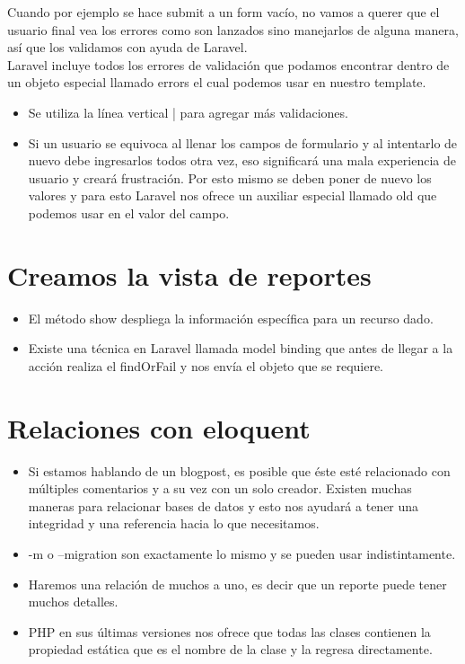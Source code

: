 \documentclass{article}
\begin{document}
Cuando por ejemplo se hace submit a un form vacío, no vamos a querer que el
usuario final vea los errores como son lanzados sino manejarlos de alguna
manera, así que los validamos con ayuda de Laravel.\\

Laravel incluye todos los errores de validación que podamos encontrar dentro de
un objeto especial llamado errors el cual podemos usar en nuestro template.\\

\begin{itemize}
  \item Se utiliza la línea vertical | para agregar más validaciones.
  \item Si un usuario se equivoca al llenar los campos de formulario y al
    intentarlo de nuevo debe ingresarlos todos otra vez, eso significará una
    mala experiencia de usuario y creará frustración. Por esto mismo se deben
    poner de nuevo los valores y para esto Laravel nos ofrece un auxiliar
    especial llamado old que podemos usar en el valor del campo.
\end{itemize}


\section{Creamos la vista de reportes}%
\begin{itemize}
  \item El método show despliega la información específica para un recurso
    dado.
  \item Existe una técnica en Laravel llamada model binding que antes de llegar
    a la acción realiza el findOrFail y nos envía el objeto que se requiere.
\end{itemize}

\section{Relaciones con eloquent}%
\begin{itemize}
  \item Si estamos hablando de un blogpost, es posible que éste esté
    relacionado con múltiples comentarios y a su vez con un solo creador.
    Existen muchas maneras para relacionar bases de datos y esto nos ayudará a
    tener una integridad y una referencia hacia lo que necesitamos.
  \item -m o –migration son exactamente lo mismo y se pueden usar
    indistintamente.
  \item Haremos una relación de muchos a uno, es decir que un reporte puede
    tener muchos detalles.
  \item PHP en sus últimas versiones nos ofrece que todas las clases contienen
    la propiedad estática que es el nombre de la clase y la regresa
    directamente.
\end{itemize}
\end{document}
